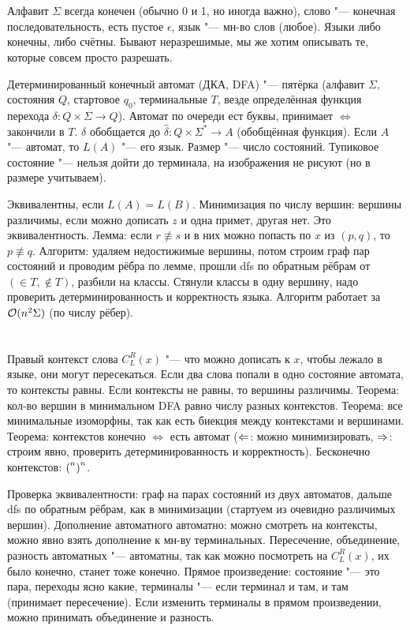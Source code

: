 \section{} %
	Алфавит $\Sigma$ всегда конечен (обычно 0 и 1, но иногда важно), слово "--- конечная последовательность, есть пустое $\epsilon$, язык "--- мн-во слов (любое).
	Языки либо конечны, либо счётны.
	Бывают неразрешимые, мы же хотим описывать те, которые совсем просто разрешать.

	Детерминированный конечный автомат (ДКА, DFA) "--- пятёрка (алфавит $\Sigma,$ состояния $Q$, стартовое $q_0$, терминальные $T$,
	везде определённая функция перехода $\delta \colon Q \times \Sigma \to Q$).
	Автомат по очереди ест буквы, принимает $\iff$ закончили в $T$.
	$\delta$ обобщается до $\hat\delta\colon Q \times \Sigma^* \to A$ (обобщённая функция).
	Если $A$ "--- автомат, то $L(A)$ "--- его язык.
	Размер "--- число состояний.
	Тупиковое состояние "--- нельзя дойти до терминала, на изображения не рисуют (но в размере учитываем).

	Эквивалентны, если $L(A)=L(B)$.
	Минимизация по числу вершин: вершины различимы, если можно дописать $z$ и одна примет, другая нет.
	Это эквивалентность.
	Лемма: если $r \nequiv s$ и в них можно попасть по $x$ из $(p, q)$, то $p \nequiv q$.
	Алгоритм: удаляем недостижимые вершины, потом строим граф пар состояний и проводим рёбра по лемме,
	прошли dfs по обратным рёбрам от $(\in T, \notin T)$, разбили на классы.
	Стянули классы в одну вершину, надо проверить детерминированность и корректность языка.
	Алгоритм работает за $\mathcal O(n^2 \Sigma)$ (по числу рёбер).

\section{} %
	Правый контекст слова $C_L^R(x)$ "--- что можно дописать к $x$, чтобы лежало в языке, они могут пересекаться.
	Если два слова попали в одно состояние автомата, то контексты равны.
	Если контексты не равны, то вершины различимы.
	Теорема: кол-во вершин в минимальном DFA равно числу разных контекстов.
	Теорема: все минимальные изоморфны, так как есть биекция между контекстами и вершинами.
	Теорема: контекстов конечно $\iff$ есть автомат ($\Leftarrow$: можно минимизировать, $\Rightarrow$: строим явно, проверить детерминированность и корректность).
	Бесконечно контекстов: $\t{(}^n\t{)}^n$.

	Проверка эквивалентности: граф на парах состояний из двух автоматов, дальше dfs по обратным рёбрам,
	как в минимизации (стартуем из очевидно различимых вершин).
	Дополнение автоматного автоматно: можно смотреть на контексты, можно явно взять дополнение к мн-ву терминальных.
	Пересечение, объединение, разность автоматных "--- автоматны, так как можно посмотреть на $C_L^R(x)$,
	их было конечно, станет тоже конечно.
	Прямое произведение: состояние "--- это пара, переходы ясно какие, терминалы "--- если терминал и там, и там
	(принимает пересечение).
	Если изменить терминалы в прямом произведении, можно принимать объединение и разность.

